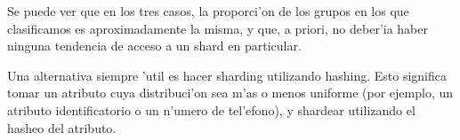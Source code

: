 Se puede ver que en los tres casos, la proporci'on de los grupos en los que clasificamos es aproximadamente la misma, y que, a priori, no deber'ia haber ninguna tendencia de acceso a un shard en particular.

Una alternativa siempre 'util es hacer sharding utilizando hashing. Esto significa tomar un atributo cuya distribuci'on sea m'as o menos uniforme (por ejemplo, un atributo identificatorio o un n'umero de tel'efono), y shardear utilizando el hasheo del atributo. 